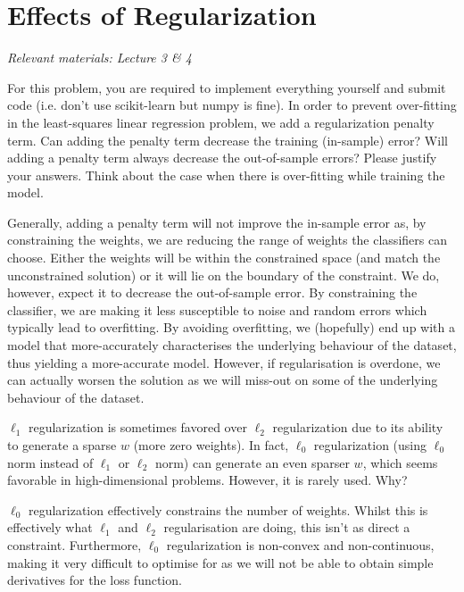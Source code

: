 \newpage
\section{Effects of Regularization}
\textit{Relevant materials: Lecture 3 \& 4}

For this problem, you are required to implement everything yourself and submit code (i.e. don't use scikit-learn but numpy is fine).
\indent\problem[4] 
In order to prevent over-fitting in the least-squares linear regression problem, we add a regularization penalty term.
Can adding the penalty term decrease the training (in-sample) error?
Will adding a penalty term always decrease the out-of-sample errors?
Please justify your answers. Think about the case when there is over-fitting while training the model.

\begin{solution}
 Generally, adding a penalty term will not improve the in-sample error as, by constraining the weights, we are reducing the range of weights the classifiers can choose. Either the weights will be within the constrained space (and match the unconstrained solution) or it will lie on the boundary of the constraint. We do, however, expect it to decrease the out-of-sample error. By constraining the classifier, we are making it less susceptible to noise and random errors which typically lead to overfitting. By avoiding overfitting, we (hopefully) end up with a model that more-accurately characterises the underlying behaviour of the dataset, thus yielding a more-accurate model. However, if regularisation is overdone, we can actually worsen the solution as we will miss-out on some of the underlying behaviour of the dataset.
\end{solution}

\problem[4]
$\ell_1$ regularization is sometimes favored over $\ell_2$ regularization due to its ability to generate a sparse $w$ (more zero weights).
In fact, $\ell_0$ regularization (using $\ell_0$ norm instead of $\ell_1$ or $\ell_2$ norm) can generate an even sparser $w$, which seems favorable in high-dimensional problems.
However, it is rarely used.  Why?

\begin{solution}
 $\ell_0$ regularization effectively constrains the number of weights. Whilst this is effectively what $\ell_1$ and $\ell_2$ regularisation are doing, this isn't as direct a constraint. Furthermore, $\ell_0$ regularization is non-convex and non-continuous, making it very difficult to optimise for as we will not be able to obtain simple derivatives for the loss function.
\end{solution}

